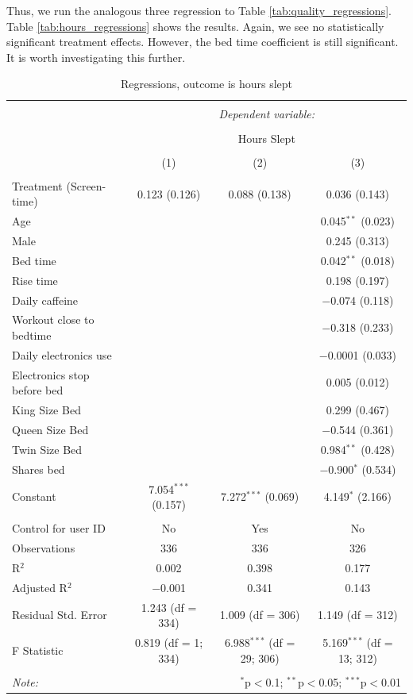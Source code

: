 \documentclass[12pt,]{article}
\begin{document}
Thus, we run the analogous three regression to Table
\ref{tab:quality_regressions}. Table \ref{tab:hours_regressions} shows
the results. Again, we see no statistically significant treatment
effects. However, the bed time coefficient is still significant. It is
worth investigating this further.

\begin{table}[!htbp] \centering 
  \caption{\label{tab:hours_regressions} Regressions, outcome is hours slept} 
  \label{} 
\begin{tabular}{@{\extracolsep{5pt}}lccc} 
\\[-1.8ex]\hline 
\hline \\[-1.8ex] 
 & \multicolumn{3}{c}{\textit{Dependent variable:}} \\ 
\cline{2-4} 
\\[-1.8ex] & \multicolumn{3}{c}{Hours Slept} \\ 
\\[-1.8ex] & (1) & (2) & (3)\\ 
\hline \\[-1.8ex] 
 Treatment (Screen-time) & 0.123 (0.126) & 0.088 (0.138) & 0.036 (0.143) \\ 
  Age &  &  & 0.045$^{**}$ (0.023) \\ 
  Male &  &  & 0.245 (0.313) \\ 
  Bed time &  &  & 0.042$^{**}$ (0.018) \\ 
  Rise time &  &  & 0.198 (0.197) \\ 
  Daily caffeine &  &  & $-$0.074 (0.118) \\ 
  Workout close to bedtime &  &  & $-$0.318 (0.233) \\ 
  Daily electronics use &  &  & $-$0.0001 (0.033) \\ 
  Electronics stop before bed &  &  & 0.005 (0.012) \\ 
  King Size Bed &  &  & 0.299 (0.467) \\ 
  Queen Size Bed &  &  & $-$0.544 (0.361) \\ 
  Twin Size Bed &  &  & 0.984$^{**}$ (0.428) \\ 
  Shares bed &  &  & $-$0.900$^{*}$ (0.534) \\ 
  Constant & 7.054$^{***}$ (0.157) & 7.272$^{***}$ (0.069) & 4.149$^{*}$ (2.166) \\ 
 \hline \\[-1.8ex] 
Control for user ID & No & Yes & No \\ 
Observations & 336 & 336 & 326 \\ 
R$^{2}$ & 0.002 & 0.398 & 0.177 \\ 
Adjusted R$^{2}$ & $-$0.001 & 0.341 & 0.143 \\ 
Residual Std. Error & 1.243 (df = 334) & 1.009 (df = 306) & 1.149 (df = 312) \\ 
F Statistic & 0.819 (df = 1; 334) & 6.988$^{***}$ (df = 29; 306) & 5.169$^{***}$ (df = 13; 312) \\ 
\hline 
\hline \\[-1.8ex] 
\textit{Note:}  & \multicolumn{3}{r}{$^{*}$p$<$0.1; $^{**}$p$<$0.05; $^{***}$p$<$0.01} \\ 
\end{tabular} 
\end{table}
\end{document}
